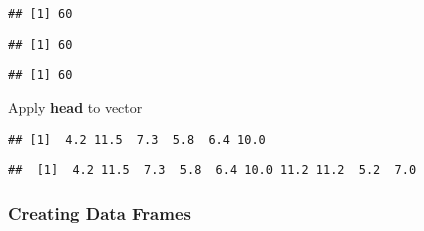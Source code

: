 \documentclass[
]{article}
\newenvironment{Shaded}{\begin{snugshade}}{\end{snugshade}}
\newcommand{\DecValTok}[1]{\textcolor[rgb]{0.00,0.00,0.81}{#1}}
\newcommand{\FunctionTok}[1]{\textcolor[rgb]{0.00,0.00,0.00}{#1}}
\newcommand{\NormalTok}[1]{#1}
\newcommand{\SpecialCharTok}[1]{\textcolor[rgb]{0.00,0.00,0.00}{#1}}
\begin{document}
\begin{verbatim}
## [1] 60
\end{verbatim}

\begin{Shaded}
\end{Shaded}

\begin{verbatim}
## [1] 60
\end{verbatim}

\begin{Shaded}
\end{Shaded}

\begin{verbatim}
## [1] 60
\end{verbatim}

Apply \textbf{head} to vector

\begin{Shaded}
\end{Shaded}

\begin{verbatim}
## [1]  4.2 11.5  7.3  5.8  6.4 10.0
\end{verbatim}

\begin{Shaded}
\end{Shaded}

\begin{verbatim}
##  [1]  4.2 11.5  7.3  5.8  6.4 10.0 11.2 11.2  5.2  7.0
\end{verbatim}

\hypertarget{creating-data-frames}{%
\subsubsection{Creating Data Frames}\label{creating-data-frames}}
\end{document}
